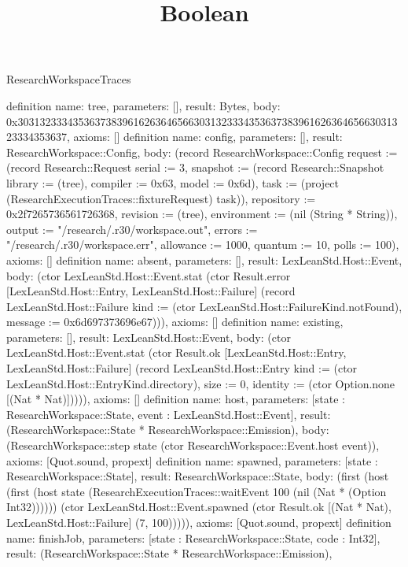 \begin{lexlean}{ResearchWorkspaceTraces}
\title{Boolean}
\begin{semanticmodule}

definition{
 name: tree,
 parameters: [],
 result: Bytes,
 body: 0x30313233343536373839616263646566303132333435363738396162636465663031323334353637,
 axioms: []
}
definition{
 name: config,
 parameters: [],
 result: ResearchWorkspace::Config,
 body: (record ResearchWorkspace::Config {request := (record Research::Request {serial := 3, snapshot := (record Research::Snapshot {library := (tree), compiler := 0x63, model := 0x6d}), task := (project (ResearchExecutionTraces::fixtureRequest) task)}), repository := 0x2f7265736561726368, revision := (tree), environment := (nil (String * String)), output := "/research/.r30/workspace.out", errors := "/research/.r30/workspace.err", allowance := 1000, quantum := 10, polls := 100}),
 axioms: []
}
definition{
 name: absent,
 parameters: [],
 result: LexLeanStd.Host::Event,
 body: (ctor LexLeanStd.Host::Event.stat (ctor Result.error [LexLeanStd.Host::Entry, LexLeanStd.Host::Failure] (record LexLeanStd.Host::Failure {kind := (ctor LexLeanStd.Host::FailureKind.notFound), message := 0x6d697373696e67}))),
 axioms: []
}
definition{
 name: existing,
 parameters: [],
 result: LexLeanStd.Host::Event,
 body: (ctor LexLeanStd.Host::Event.stat (ctor Result.ok [LexLeanStd.Host::Entry, LexLeanStd.Host::Failure] (record LexLeanStd.Host::Entry {kind := (ctor LexLeanStd.Host::EntryKind.directory), size := 0, identity := (ctor Option.none [(Nat * Nat)])}))),
 axioms: []
}
definition{
 name: host,
 parameters: [state : ResearchWorkspace::State, event : LexLeanStd.Host::Event],
 result: (ResearchWorkspace::State * ResearchWorkspace::Emission),
 body: (ResearchWorkspace::step state (ctor ResearchWorkspace::Event.host event)),
 axioms: [Quot.sound, propext]
}
definition{
 name: spawned,
 parameters: [state : ResearchWorkspace::State],
 result: ResearchWorkspace::State,
 body: (first (host (first (host state (ResearchExecutionTraces::waitEvent 100 (nil (Nat * (Option Int32)))))) (ctor LexLeanStd.Host::Event.spawned (ctor Result.ok [(Nat * Nat), LexLeanStd.Host::Failure] (7, 100))))),
 axioms: [Quot.sound, propext]
}
definition{
 name: finishJob,
 parameters: [state : ResearchWorkspace::State, code : Int32],
 result: (ResearchWorkspace::State * ResearchWorkspace::Emission),
}
\end{semanticmodule}
\end{lexlean}
